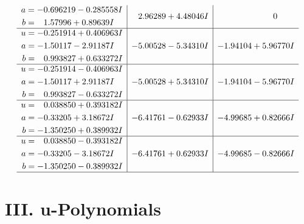\documentclass[1p]{elsarticle_modified}
\theoremstyle{definition}
\begin{document}
$$\begin{array}{c|c|c}
\begin{aligned}
a &= -0.696219 - 0.285558 I \\
b &= \phantom{-}1.57996 + 0.89639 I\end{aligned}
 & \phantom{-}2.96289 + 4.48046 I & \phantom{-0.000000 } 0 \\ \hline\begin{aligned}
u &= -0.251914 + 0.406963 I \\
a &= -1.50117 - 2.91187 I \\
b &= \phantom{-}0.993827 + 0.633272 I\end{aligned}
 & -5.00528 - 5.34310 I & -1.94104 + 5.96770 I \\ \hline\begin{aligned}
u &= -0.251914 - 0.406963 I \\
a &= -1.50117 + 2.91187 I \\
b &= \phantom{-}0.993827 - 0.633272 I\end{aligned}
 & -5.00528 + 5.34310 I & -1.94104 - 5.96770 I \\ \hline\begin{aligned}
u &= \phantom{-}0.038850 + 0.393182 I \\
a &= -0.33205 + 3.18672 I \\
b &= -1.350250 + 0.389932 I\end{aligned}
 & -6.41761 - 0.62933 I & -4.99685 + 0.82666 I \\ \hline\begin{aligned}
u &= \phantom{-}0.038850 - 0.393182 I \\
a &= -0.33205 - 3.18672 I \\
b &= -1.350250 - 0.389932 I\end{aligned}
 & -6.41761 + 0.62933 I & -4.99685 - 0.82666 I\\
 \hline 
 \end{array}$$\newpage
\newpage\renewcommand{\arraystretch}{1}
\centering \section*{ III. u-Polynomials}
\end{document}

